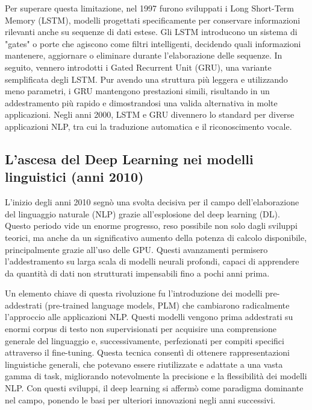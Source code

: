 \documentclass[target=mst,aauheader=,style=]{thud}
\begin{document}
Per superare questa limitazione, nel 1997 furono sviluppati i Long Short-Term Memory (LSTM), modelli progettati specificamente per conservare informazioni rilevanti anche su sequenze di dati estese. Gli LSTM introducono un sistema di "gates" o porte che agiscono come filtri intelligenti, decidendo quali informazioni mantenere, aggiornare o eliminare durante l'elaborazione delle sequenze.
In seguito, vennero introdotti i Gated Recurrent Unit (GRU), una variante semplificata degli LSTM. Pur avendo una struttura più leggera e utilizzando meno parametri, i GRU mantengono prestazioni simili, risultando in un addestramento più rapido e dimostrandosi una valida alternativa in molte applicazioni. Negli anni 2000, LSTM e GRU divennero lo standard per diverse applicazioni NLP, tra cui la traduzione automatica e il riconoscimento vocale.\cite{su_2024_large_language_models_forecasting}


\subsection{L’ascesa del Deep Learning nei modelli linguistici (anni 2010)}
L’inizio degli anni 2010 segnò una svolta decisiva per il campo dell’elaborazione del linguaggio naturale (NLP) grazie all’esplosione del deep learning (DL). Questo periodo vide un enorme progresso, reso possibile non solo dagli sviluppi teorici, ma anche da un significativo aumento della potenza di calcolo disponibile, principalmente grazie all’uso delle GPU. Questi avanzamenti permisero l’addestramento su larga scala di modelli neurali profondi, capaci di apprendere da quantità di dati non strutturati impensabili fino a pochi anni prima.\cite{hadi_2024}

Un elemento chiave di questa rivoluzione fu l’introduzione dei modelli pre-addestrati (pre-trained language models, PLM) che cambiarono radicalmente l’approccio alle applicazioni NLP. Questi modelli vengono prima addestrati su enormi corpus di testo non supervisionati per acquisire una comprensione generale del linguaggio e, successivamente, perfezionati per compiti specifici attraverso il fine-tuning. Questa tecnica consentì di ottenere rappresentazioni linguistiche generali, che potevano essere riutilizzate e adattate a una vasta gamma di task, migliorando notevolmente la precisione e la flessibilità dei modelli NLP. Con questi sviluppi, il deep learning si affermò come paradigma dominante nel campo, ponendo le basi per ulteriori innovazioni negli anni successivi.\cite{su_2024_large_language_models_forecasting}
\end{document}
